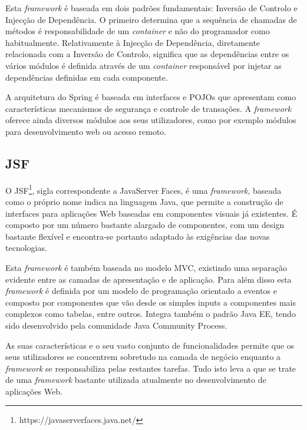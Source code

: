 Esta \textit{framework} é baseada em dois padrões fundamentais: Inversão de Controlo e Injecção de Dependência. O primeiro determina que a sequência de chamadas de métodos é responsabilidade de um \textit{container} e não do programador como habitualmente. Relativamente à Injecção de Dependência, diretamente relacionada com a Inversão de Controlo, significa que as dependências entre os vários módulos é definida através de um \textit{container} responsável por injetar as dependências definidas em cada componente.

A arquitetura do Spring é baseada em interfaces e POJOs que apresentam como características mecanismos de segurança e controle de transações. A \textit{framework} oferece ainda diversos módulos aos seus utilizadores, como por exemplo módulos para desenvolvimento web ou acesso remoto.

\subsection{JSF}

O JSF\footnote{https://javaserverfaces.java.net/}, sigla correspondente a JavaServer Faces, é uma \textit{framework}, baseada como o próprio nome indica na linguagem Java, que permite a construção de interfaces para aplicações Web baseadas em componentes visuais já existentes. É composto por um número bastante alargado de componentes, com um design bastante flexível e encontra-se portanto adaptado às exigências das novas tecnologias.

Esta \textit{framework} é também baseada no modelo MVC, existindo uma separação evidente entre as camadas de apresentação e de aplicação. Para além disso esta \textit{framework} é definida por um modelo de programação orientado a eventos e composto por componentes que vão desde os simples inputs a componentes mais complexos como tabelas, entre outros. Integra também o padrão Java EE, tendo sido desenvolvido pela comunidade Java Community Process.

As suas características e o seu vasto conjunto de funcionalidades permite que os seus utilizadores se concentrem sobretudo na camada de negócio enquanto a \textit{framework} se responsabiliza pelas restantes tarefas. Tudo isto leva a que se trate de uma \textit{framework} bastante utilizada atualmente no desenvolvimento de aplicações Web.



